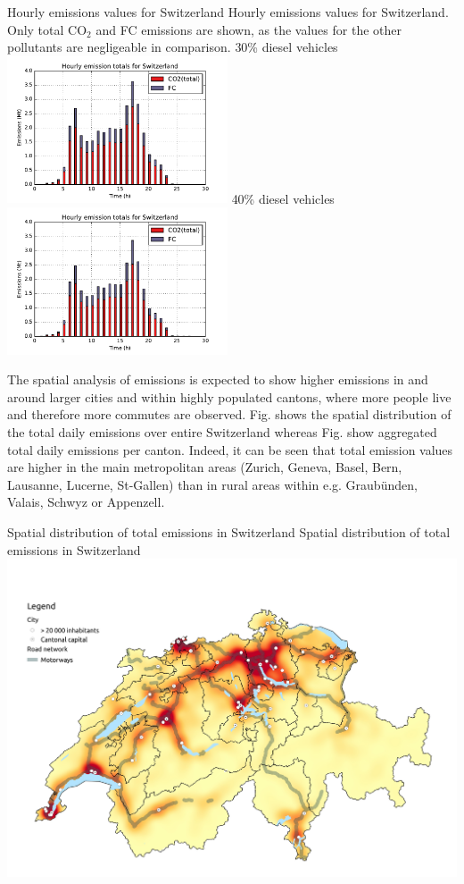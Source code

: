 \createfigure%
{Hourly emissions values for Switzerland}%
{Hourly emissions values for Switzerland. Only total CO$_2$ and FC emissions are shown, as the values for the other pollutants are negligeable in comparison.}%
{\label{fig:hourlyEmissions}}%
{%
  \createsubfigure%
  {30\% diesel vehicles}%
  {\includegraphics[width=0.49\textwidth,
angle=0]{figures/hourly_emissions_30pct_diesel.pdf}}%
  {\label{fig:hourlyEmissions-30pctDiesel}}%
  {}%
  \createsubfigure%
  {40\% diesel vehicles}%
  {\includegraphics[width=0.49\textwidth,
angle=0]{figures/hourly_emissions_40pct_diesel.pdf}}%
  {\label{fig:hourlyEmissions-30pctDiesel}}%
  {}%
}%
{}

The spatial analysis of emissions is expected to show higher emissions in and around larger cities and within highly populated cantons, where more people live and therefore more commutes are observed.
Fig. shows the spatial distribution of the total daily emissions over entire Switzerland whereas Fig. show aggregated total daily emissions per canton.
Indeed, it can be seen that total emission values are higher in the main metropolitan areas (Zurich, Geneva, Basel, Bern, Lausanne, Lucerne, St-Gallen) than in rural areas within e.g. Graub\"unden, Valais, Schwyz or Appenzell.

\createfigure%
{Spatial distribution of total emissions in Switzerland}%
{Spatial distribution of total emissions in Switzerland}%
{\label{fig:spatialEmissions}}%
{\includegraphics[width=1.0\textwidth, angle=0]{figures/total_emissions_heatmap.pdf}}%
{}

